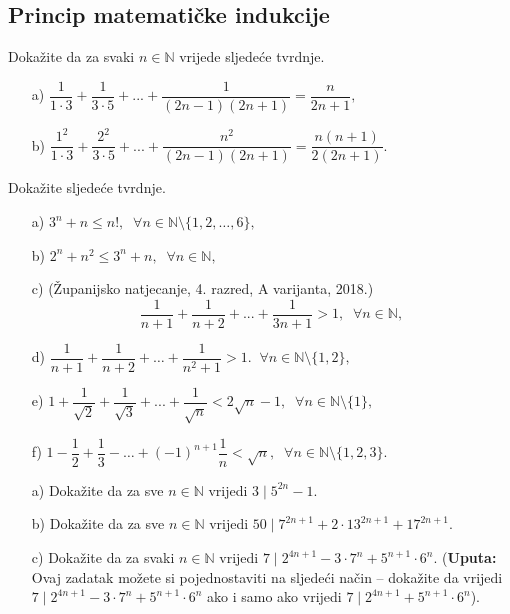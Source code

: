 \subsection*{Princip matematičke indukcije}
\begin{exercise}{\unskip}
Dokažite da za svaki \(n\in \mathbb{N}\) vrijede sljedeće tvrdnje.
\begin{itemize}
\item[a)] \(\dfrac{1}{1\cdot 3}+\dfrac{1}{3\cdot 5}+...+\dfrac{1}{(2n-1)(2n+1)}=\dfrac{n}{2n+1},\)
\item[b)] \(\dfrac{1^2}{1\cdot 3}+\dfrac{2^2}{3\cdot 5}+... +\dfrac{n^2}{(2n-1)(2n+1)}=\dfrac{n(n+1)}{2(2n+1)}.\)
\end{itemize}
\end{exercise}
\begin{exercise}{\unskip}
\label{nejedn}
Dokažite sljedeće tvrdnje.
\begin{itemize}
\item[a)]
$3^n+n\leq n!, \; \; \forall n\in \mathbb{N}\setminus\{1, 2, \dots, 6\},$
\item[b)]
$2^n+n^2\leq 3^n+n, \; \; \forall n\in \mathbb{N},$
\item[c)] (Županijsko natjecanje, 4. razred, A varijanta, 2018.)
\[\dfrac{1}{n+1}+\dfrac{1}{n+2}+...+\dfrac{1}{3n+1}>1, \; \; \forall n\in \mathbb{N},\]
\item[d)]
$\dfrac{1}{n+1}+\dfrac{1}{n+2}+\dots+\dfrac{1}{n^2+1}>1. \; \; \forall n\in \mathbb{N}\setminus\{1, 2\},$
\item[e)] \(1+\dfrac{1}{\sqrt{2}}+\dfrac{1}{\sqrt{3}}+...+\dfrac{1}{\sqrt{n}}<2\sqrt{n}-1, \; \; \forall n\in \mathbb{N}\setminus\{1\},\)
\item[f)]
$1-\dfrac{1}{2}+\dfrac{1}{3}-\dots+(-1)^{n+1}\dfrac{1}{n}<\sqrt{n}, \; \; \forall n\in \mathbb{N}\setminus\{1, 2, 3\}.$
\end{itemize}
\end{exercise}
\begin{exercise}{\unskip} \textbf{}
\begin{itemize}
\item[a)] Dokažite da za sve \(n\in \mathbb{N}\) vrijedi \(3 \mid 5^{2n}-1\).
\item[b)] Dokažite da za sve \(n\in \mathbb{N}\) vrijedi \(50 \mid 7^{2n+1}+2\cdot 13^{2n+1}+17^{2n+1}\).
\item[c)] Dokažite da za svaki \(n\in \mathbb{N}\) vrijedi \(7 \; |\; 2^{4n+1}-3\cdot 7^n+5^{n+1}\cdot 6^n\). (\textbf{Uputa:} Ovaj zadatak možete si pojednostaviti na sljedeći način -- dokažite da vrijedi \(7 \; |\; 2^{4n+1}-3\cdot 7^n+5^{n+1}\cdot 6^n\) ako i samo ako vrijedi \(7 \; |\; 2^{4n+1}+5^{n+1}\cdot 6^n\)).
\end{itemize}
\end{exercise}
